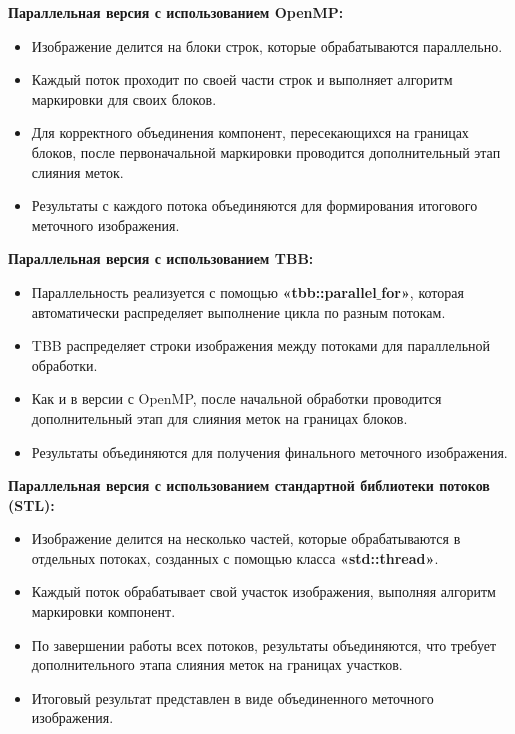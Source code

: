 \documentclass[a4paper, 14pt]{article}
\begin{document}
	\textbf{Параллельная версия с использованием OpenMP:}
	\vspace{-1em}
	\begin{itemize}[leftmargin=3em]
		\setlength\itemsep{0cm}
            \item Изображение делится на блоки строк, которые обрабатываются параллельно.
            \item Каждый поток проходит по своей части строк и выполняет алгоритм маркировки для своих блоков.
            \item Для корректного объединения компонент, пересекающихся на границах блоков, после первоначальной маркировки проводится дополнительный этап слияния меток.
            \item Результаты с каждого потока объединяются для формирования итогового меточного изображения.
	\end{itemize}

        \newpage
	\textbf{Параллельная версия с использованием TBB:}
	\vspace{-1em}
	\begin{itemize}[leftmargin=3em]
		\setlength\itemsep{0cm}
		\item Параллельность реализуется с помощью \textbf{«tbb::parallel$\_$for»}, которая автоматически распределяет выполнение цикла по разным потокам.
            \item TBB распределяет строки изображения между потоками для параллельной обработки.
            \item Как и в версии с OpenMP, после начальной обработки проводится дополнительный этап для слияния меток на границах блоков.
            \item Результаты объединяются для получения финального меточного изображения.

	\end{itemize}

	\textbf{Параллельная версия с использованием стандартной библиотеки потоков (STL):}
	\vspace{-1em}
	\begin{itemize}[leftmargin=3em]
		\setlength\itemsep{0cm}
        \item Изображение делится на несколько частей, которые обрабатываются в отдельных потоках, созданных с помощью класса \textbf{«std::thread»}.
        \item Каждый поток обрабатывает свой участок изображения, выполняя алгоритм маркировки компонент.
        \item По завершении работы всех потоков, результаты объединяются, что требует дополнительного этапа слияния меток на границах участков.
        \item Итоговый результат представлен в виде объединенного меточного изображения.
	\end{itemize}
\end{document}
